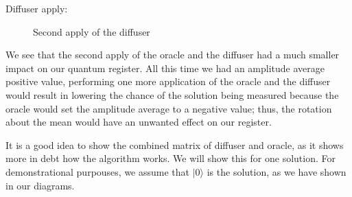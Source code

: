 Diffuser apply:
\begin{center}
\begin{figure}[h]
\caption{Second apply of the diffuser}
\end{figure}
\end{center}

We see that the second apply of the oracle and the diffuser had a much smaller impact on our quantum register. All this time we had an amplitude average positive value, performing one more application of the oracle and the diffuser would result in lowering the chance of the solution being measured because the oracle would set the amplitude average to a negative value; thus, the rotation about the mean would have an unwanted effect on our register.

It is a good idea to show the combined matrix of diffuser and oracle, as it shows more in debt how the algorithm works. We will show this for one solution. For demonstrational purpouses, we assume that $|0\rangle$ is the solution, as we have shown in our diagrams.

